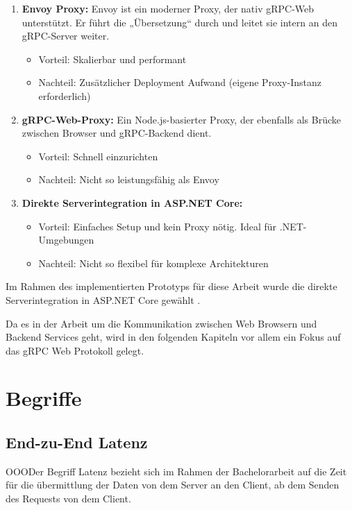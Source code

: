\begin{enumerate}
	\item \textbf{Envoy Proxy:}
	Envoy ist ein moderner Proxy, der nativ gRPC-Web unterstützt. Er führt die „Übersetzung“ durch und leitet sie intern an den gRPC-Server weiter.	
	\begin{itemize}
		\item Vorteil: Skalierbar und performant
		\item Nachteil: Zusätzlicher Deployment Aufwand (eigene Proxy-Instanz erforderlich)
	\end{itemize}
	
	\item \textbf{gRPC-Web-Proxy:}
	Ein Node.js-basierter Proxy, der ebenfalls als Brücke zwischen Browser und gRPC-Backend dient.
	\begin{itemize}
		\item Vorteil: Schnell einzurichten
		\item Nachteil: Nicht so leistungsfähig als Envoy
	\end{itemize}

	
	\item \textbf{Direkte Serverintegration in ASP.NET Core:}
	\begin{itemize}
		\item Vorteil: Einfaches Setup und kein Proxy nötig. Ideal für .NET-Umgebungen
		\item Nachteil: Nicht so flexibel für komplexe Architekturen
	\end{itemize}
\end{enumerate}

Im Rahmen des implementierten Prototyps für diese Arbeit wurde die direkte Serverintegration in ASP.NET Core gewählt \parencite{grpc-web-docs,aspnet-grpcweb}.

Da es in der Arbeit um die Kommunikation zwischen Web Browsern und Backend Services geht, wird in den folgenden Kapiteln vor allem ein Fokus auf das gRPC Web Protokoll gelegt.

\clearpage
\section{Begriffe}
\subsection{End-zu-End Latenz}
OOODer Begriff Latenz bezieht sich im Rahmen der Bachelorarbeit auf die Zeit für die übermittlung der Daten von dem Server an den Client, ab dem Senden des Requests von dem Client.


